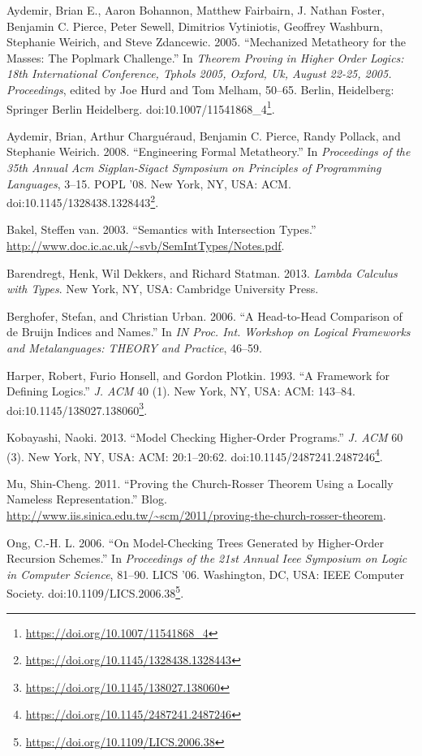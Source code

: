 \documentclass[a4paper, 12pt, twoside]{style/ociamthesis}
\theoremstyle{plain}
\theoremstyle{definition}
\theoremstyle{remark}
\renewcommand{\href}[2]{#2\footnote{\url{#1}}}
\begin{document}
\hypertarget{refs}{}
\hypertarget{ref-aydemir05}{}
Aydemir, Brian E., Aaron Bohannon, Matthew Fairbairn, J. Nathan Foster,
Benjamin C. Pierce, Peter Sewell, Dimitrios Vytiniotis, Geoffrey
Washburn, Stephanie Weirich, and Steve Zdancewic. 2005. ``Mechanized
Metatheory for the Masses: The Poplmark Challenge.'' In \emph{Theorem
Proving in Higher Order Logics: 18th International Conference, Tphols
2005, Oxford, Uk, August 22-25, 2005. Proceedings}, edited by Joe Hurd
and Tom Melham, 50--65. Berlin, Heidelberg: Springer Berlin Heidelberg.
doi:\href{https://doi.org/10.1007/11541868_4}{10.1007/11541868\_4}.

\hypertarget{ref-aydemir08}{}
Aydemir, Brian, Arthur Charguéraud, Benjamin C. Pierce, Randy Pollack,
and Stephanie Weirich. 2008. ``Engineering Formal Metatheory.'' In
\emph{Proceedings of the 35th Annual Acm Sigplan-Sigact Symposium on
Principles of Programming Languages}, 3--15. POPL '08. New York, NY,
USA: ACM.
doi:\href{https://doi.org/10.1145/1328438.1328443}{10.1145/1328438.1328443}.

\hypertarget{ref-bakel}{}
Bakel, Steffen van. 2003. ``Semantics with Intersection Types.''
\url{http://www.doc.ic.ac.uk/~svb/SemIntTypes/Notes.pdf}.

\hypertarget{ref-barendregt13}{}
Barendregt, Henk, Wil Dekkers, and Richard Statman. 2013. \emph{Lambda
Calculus with Types}. New York, NY, USA: Cambridge University Press.

\hypertarget{ref-berghofer06}{}
Berghofer, Stefan, and Christian Urban. 2006. ``A Head-to-Head
Comparison of de Bruijn Indices and Names.'' In \emph{IN Proc. Int.
Workshop on Logical Frameworks and Metalanguages: THEORY and Practice},
46--59.

\hypertarget{ref-harper93}{}
Harper, Robert, Furio Honsell, and Gordon Plotkin. 1993. ``A Framework
for Defining Logics.'' \emph{J. ACM} 40 (1). New York, NY, USA: ACM:
143--84.
doi:\href{https://doi.org/10.1145/138027.138060}{10.1145/138027.138060}.

\hypertarget{ref-kobayashi13}{}
Kobayashi, Naoki. 2013. ``Model Checking Higher-Order Programs.''
\emph{J. ACM} 60 (3). New York, NY, USA: ACM: 20:1--20:62.
doi:\href{https://doi.org/10.1145/2487241.2487246}{10.1145/2487241.2487246}.

\hypertarget{ref-shing-cheng}{}
Mu, Shin-Cheng. 2011. ``Proving the Church-Rosser Theorem Using a
Locally Nameless Representation.'' Blog.
\url{http://www.iis.sinica.edu.tw/~scm/2011/proving-the-church-rosser-theorem}.

\hypertarget{ref-ong06}{}
Ong, C.-H. L. 2006. ``On Model-Checking Trees Generated by Higher-Order
Recursion Schemes.'' In \emph{Proceedings of the 21st Annual Ieee
Symposium on Logic in Computer Science}, 81--90. LICS '06. Washington,
DC, USA: IEEE Computer Society.
doi:\href{https://doi.org/10.1109/LICS.2006.38}{10.1109/LICS.2006.38}.
\end{document}
